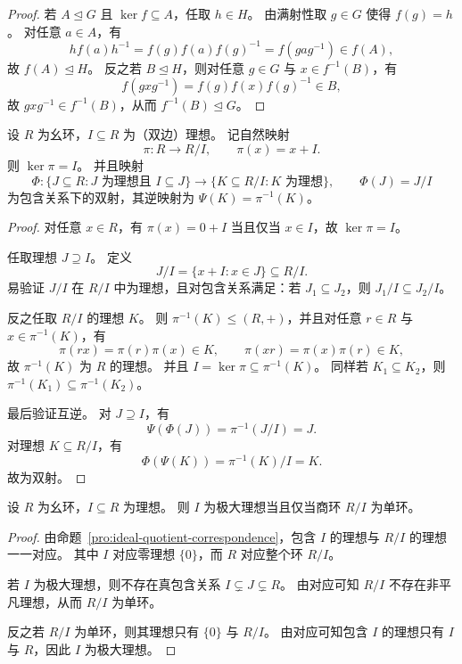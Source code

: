 \documentclass[lang=cn,a4paper,newtx]{elegantbook}
\begin{document}
\begin{proof}
若 $A\trianglelefteq G$ 且 $\ker f\subseteq A$，任取 $h\in H$。
由满射性取 $g\in G$ 使得 $f(g)=h$。
对任意 $a\in A$，有
\[
  h f(a) h^{-1}=f(g)f(a)f(g)^{-1}=f(gag^{-1})\in f(A),
\]
故 $f(A)\trianglelefteq H$。
反之若 $B\trianglelefteq H$，则对任意 $g\in G$ 与 $x\in f^{-1}(B)$，有
\[
  f(gxg^{-1})=f(g)f(x)f(g)^{-1}\in B,
\]
故 $gxg^{-1}\in f^{-1}(B)$，从而 $f^{-1}(B)\trianglelefteq G$。
\end{proof}

\begin{proposition}[理想与商环理想的对应]\label{ideal-quotient-correspondence}
设 $R$ 为幺环，$I\subseteq R$ 为（双边）理想。
记自然映射
\[
  \pi:R\to R/I,\qquad \pi(x)=x+I.
\]
则 $\ker\pi=I$。
并且映射
\[
  \Phi:\{J\subseteq R: J\text{ 为理想且 }I\subseteq J\}\to\{K\subseteq R/I:K\text{ 为理想}\},\qquad \Phi(J)=J/I
\]
为包含关系下的双射，其逆映射为 $\Psi(K)=\pi^{-1}(K)$。
\end{proposition}

\begin{proof}
对任意 $x\in R$，有 $\pi(x)=0+I$ 当且仅当 $x\in I$，故 $\ker\pi=I$。

任取理想 $J\supseteq I$。
定义
\[
  J/I=\{x+I:x\in J\}\subseteq R/I.
\]
易验证 $J/I$ 在 $R/I$ 中为理想，且对包含关系满足：若 $J_1\subseteq J_2$，则 $J_1/I\subseteq J_2/I$。

反之任取 $R/I$ 的理想 $K$。
则 $\pi^{-1}(K)\le (R,+)$，并且对任意 $r\in R$ 与 $x\in \pi^{-1}(K)$，有
\[
  \pi(rx)=\pi(r)\pi(x)\in K,\qquad \pi(xr)=\pi(x)\pi(r)\in K,
\]
故 $\pi^{-1}(K)$ 为 $R$ 的理想。
并且 $I=\ker\pi\subseteq \pi^{-1}(K)$。
同样若 $K_1\subseteq K_2$，则 $\pi^{-1}(K_1)\subseteq \pi^{-1}(K_2)$。

最后验证互逆。
对 $J\supseteq I$，有
\[
  \Psi(\Phi(J))=\pi^{-1}(J/I)=J.
\]
对理想 $K\subseteq R/I$，有
\[
  \Phi(\Psi(K))=\pi^{-1}(K)/I=K.
\]
故为双射。
\end{proof}

\begin{proposition}\label{maximal-iff-simple}
设 $R$ 为幺环，$I\subseteq R$ 为理想。
则 $I$ 为极大理想当且仅当商环 $R/I$ 为单环。
\end{proposition}

\begin{proof}
由命题~\ref{pro:ideal-quotient-correspondence}，包含 $I$ 的理想与 $R/I$ 的理想一一对应。
其中 $I$ 对应零理想 $\{0\}$，而 $R$ 对应整个环 $R/I$。

若 $I$ 为极大理想，则不存在真包含关系 $I\subsetneq J\subsetneq R$。
由对应可知 $R/I$ 不存在非平凡理想，从而 $R/I$ 为单环。

反之若 $R/I$ 为单环，则其理想只有 $\{0\}$ 与 $R/I$。
由对应可知包含 $I$ 的理想只有 $I$ 与 $R$，因此 $I$ 为极大理想。
\end{proof}
\end{document}
